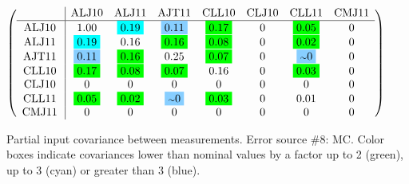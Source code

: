 \begin{table}[H]
\scriptsize
\begin{center}
\renewcommand{\arraystretch}{1.1}
\begin{math}\left(\begin{array}{c|ccccccc}
 & \mathrm{ALJ10} & 
\mathrm{ALJ11} & 
\mathrm{AJT11} & 
\mathrm{CLL10} & 
\mathrm{CLJ10} & 
\mathrm{CLL11} & 
\mathrm{CMJ11} \\
\hline
\mathrm{ALJ10} \hspace*{2pt} &       1.00 &  \colorbox{Cyan1}{$      0.19$} &  \colorbox{SkyBlue1}{$      0.11$} &  \colorbox{Green1}{$      0.17$} &  0 &  \colorbox{Green1}{$      0.05$} &  0 \\
\mathrm{ALJ11} \hspace*{2pt} &  \colorbox{Cyan1}{$      0.19$} &       0.16 &  \colorbox{Green1}{$      0.16$} &  \colorbox{Green1}{$      0.08$} &  0 &  \colorbox{Green1}{$      0.02$} &  0 \\
\mathrm{AJT11} \hspace*{2pt} &  \colorbox{SkyBlue1}{$      0.11$} &  \colorbox{Green1}{$      0.16$} &       0.25 &  \colorbox{Green1}{$      0.07$} &  0 &  \colorbox{SkyBlue1}{$ {\scriptstyle \sim }0$} &  0 \\
\mathrm{CLL10} \hspace*{2pt} &  \colorbox{Green1}{$      0.17$} &  \colorbox{Green1}{$      0.08$} &  \colorbox{Green1}{$      0.07$} &       0.16 &  0 &  \colorbox{Green1}{$      0.03$} &  0 \\
\mathrm{CLJ10} \hspace*{2pt} &  0 &  0 &  0 &  0 &  0 &  0 &  0 \\
\mathrm{CLL11} \hspace*{2pt} &  \colorbox{Green1}{$      0.05$} &  \colorbox{Green1}{$      0.02$} &  \colorbox{SkyBlue1}{$ {\scriptstyle \sim }0$} &  \colorbox{Green1}{$      0.03$} &  0 &       0.01 &  0 \\
\mathrm{CMJ11} \hspace*{2pt} &  0 &  0 &  0 &  0 &  0 &  0 &  0 \\
\end{array}\right)\end{math}
\caption{Partial input covariance between measurements. Error source \#8: MC. Color boxes indicate covariances lower than nominal values by a factor up to 2 (green), up to 3 (cyan) or greater than 3 (blue).}
\renewcommand{\arraystretch}{1}
\end{center}
\end{table}
